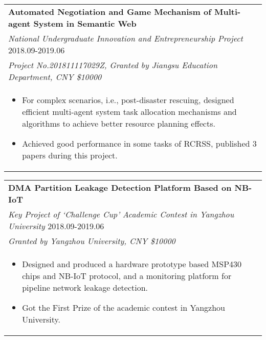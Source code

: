 \documentclass{resume}
\begin{document}
\begin{tabular*}{16.4cm}{l@{\extracolsep{\fill}}}
  \textbf{Automated Negotiation and Game Mechanism of Multi-agent System in Semantic Web}\\
  \emph{National Undergraduate Innovation and Entrepreneurship Project} \hfill 2018.09-2019.06\\
  \emph{Project No.201811117029Z, Granted by Jiangsu Education Department, CNY \$10000}\\
  \multicolumn{1}{p{16.4cm}}{
    \vspace{-0.15cm}  
  \begin{itemize}
      \item For complex scenarios, i.e., post-disaster rescuing, designed efficient multi-agent system task allocation mechanisms and algorithms to achieve better resource planning effects.
      \item Achieved good performance in some tasks of RCRSS, published 3 papers during this project.
      \end{itemize}}
  \end{tabular*}

  \vspace{-0.5cm}
\begin{tabular*}{16.2cm}{l@{\extracolsep{\fill}}}
\textbf{DMA Partition Leakage Detection Platform Based on NB-IoT} \\
\emph{Key Project of `Challenge Cup' Academic Contest in Yangzhou University} \hfill 2018.09-2019.06\\
\emph{Granted by Yangzhou University, CNY \$10000}\\
\multicolumn{1}{p{16.4cm}}{
  \vspace{-0.15cm}  
\begin{itemize}
    \item Designed and produced a hardware prototype based MSP430 chips and NB-IoT protocol, and a monitoring platform for pipeline network leakage detection.
    \item Got the First Prize of the academic contest in Yangzhou University.
    \end{itemize}}
\end{tabular*}

\vspace{-0.4cm} 

\end{document}
